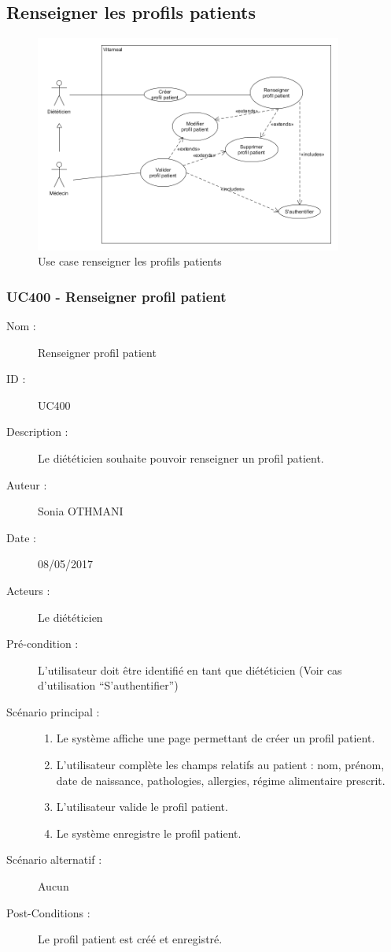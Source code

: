 \subsection{Renseigner les profils patients}

\begin{figure}[!h]
  \label{diagramme-renseigner-les-profils-patients}
  \centering
  \includegraphics[width=0.9\textwidth]{../../CasDUtilisations/ProfilPatient/ProfilPatient.png}
  \caption{Use case renseigner les profils patients}
\end{figure}

\subsubsection{UC400 - Renseigner profil patient}
\begin{description}
\item [Nom :] Renseigner profil patient
\item [ID :] UC400
\item [Description :] Le diététicien souhaite pouvoir renseigner un profil patient.
\item [Auteur :] Sonia OTHMANI
\item [Date :] 08/05/2017
\item [Acteurs :] Le diététicien
\item [Pré-condition :] L’utilisateur doit être identifié en tant que diététicien (Voir cas d’utilisation \enquote{S’authentifier})
\item [Scénario principal :]
  \begin{enumerate}
  \item Le système affiche une page permettant de créer un profil patient.
  \item L’utilisateur complète les champs relatifs au patient : nom, prénom, date de naissance, pathologies, allergies, régime alimentaire prescrit.
  \item L’utilisateur valide le profil patient.
  \item Le système enregistre le profil patient.
  \end{enumerate}
\item [Scénario alternatif :] Aucun
\item [Post-Conditions :] Le profil patient est créé et enregistré.
\end{description}

